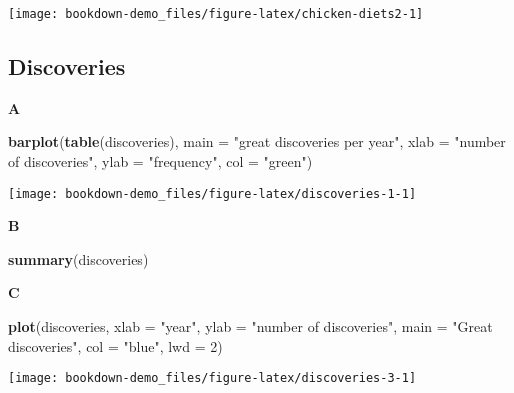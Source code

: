 \documentclass[]{book}
\newenvironment{Shaded}{\begin{snugshade}}{\end{snugshade}}
\newcommand{\DataTypeTok}[1]{\textcolor[rgb]{0.13,0.29,0.53}{#1}}
\newcommand{\DecValTok}[1]{\textcolor[rgb]{0.00,0.00,0.81}{#1}}
\newcommand{\KeywordTok}[1]{\textcolor[rgb]{0.13,0.29,0.53}{\textbf{#1}}}
\newcommand{\NormalTok}[1]{#1}
\newcommand{\StringTok}[1]{\textcolor[rgb]{0.31,0.60,0.02}{#1}}
\begin{document}
\begin{center}\texttt{[image: bookdown-demo\_files/figure-latex/chicken-diets2-1]} \end{center}

\hypertarget{discoveries-1}{%
\subsection{Discoveries}\label{discoveries-1}}

\textbf{A}

\begin{Shaded}
\begin{Highlighting}[]
\KeywordTok{barplot}\NormalTok{(}\KeywordTok{table}\NormalTok{(discoveries),}
    \DataTypeTok{main =} \StringTok{"great discoveries per year"}\NormalTok{,}
    \DataTypeTok{xlab =} \StringTok{"number of discoveries"}\NormalTok{,}
    \DataTypeTok{ylab =} \StringTok{"frequency"}\NormalTok{,}
    \DataTypeTok{col =} \StringTok{"green"}\NormalTok{)}
\end{Highlighting}
\end{Shaded}

\begin{center}\texttt{[image: bookdown-demo\_files/figure-latex/discoveries-1-1]} \end{center}

\textbf{B}

\begin{Shaded}
\begin{Highlighting}[]
\KeywordTok{summary}\NormalTok{(discoveries)}
\end{Highlighting}
\end{Shaded}

\textbf{C}

\begin{Shaded}
\begin{Highlighting}[]
\KeywordTok{plot}\NormalTok{(discoveries,}
         \DataTypeTok{xlab =} \StringTok{"year"}\NormalTok{,}
         \DataTypeTok{ylab =} \StringTok{"number of discoveries"}\NormalTok{,}
         \DataTypeTok{main =} \StringTok{"Great discoveries"}\NormalTok{,}
         \DataTypeTok{col =} \StringTok{"blue"}\NormalTok{, }
         \DataTypeTok{lwd =} \DecValTok{2}\NormalTok{)}
\end{Highlighting}
\end{Shaded}

\begin{center}\texttt{[image: bookdown-demo\_files/figure-latex/discoveries-3-1]} \end{center}
\end{document}
